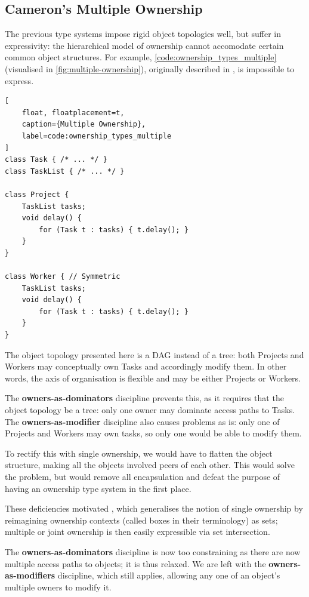 \documentclass{acm_proc_article-sp}
\begin{document}
\subsection{Cameron's Multiple Ownership}
\label{subsec:cameron}

The previous type systems impose rigid object topologies well, but suffer in
expressivity: the hierarchical model of ownership cannot accomodate certain
common object structures. For example,
\cref{code:ownership_types_multiple} (visualised in
\cref{fig:multiple-ownership}), originally described in
\cite{cameron07mojo}, is impossible to express.

\begin{lstlisting}[
	float, floatplacement=t,
	caption={Multiple Ownership},
	label=code:ownership_types_multiple
]
class Task { /* ... */ }
class TaskList { /* ... */ }

class Project {
	TaskList tasks;
	void delay() {
		for (Task t : tasks) { t.delay(); }
	}
}

class Worker { // Symmetric
	TaskList tasks;
	void delay() {
		for (Task t : tasks) { t.delay(); }
	}
}
\end{lstlisting}

The object topology presented here is a DAG instead of a tree: both Projects and
Workers may conceptually own Tasks and accordingly modify them. In other words,
the axis of organisation is flexible and may be either Projects or Workers.

The \textbf{owners-as-dominators} discipline prevents this, as it requires that
the object topology be a tree: only one owner may dominate access paths to
Tasks. The \textbf{owners-as-modifier} discipline also causes problems as is:
only one of Projects and Workers may own tasks, so only one would be able to
modify them.

To rectify this with single ownership, we would have to flatten the object
structure, making all the objects involved peers of each other. This would solve
the problem, but would remove all encapsulation and defeat the purpose of having
an ownership type system in the first place.

These deficiencies motivated \cite{cameron07mojo}, which generalises the notion
of single ownership by reimagining ownership contexts (called boxes in their
terminology) as sets; multiple or joint ownership is then easily expressible via
set intersection.

The \textbf{owners-as-dominators} discipline is now too constraining as there
are now multiple access paths to objects; it is thus relaxed. We are left with
the \textbf{owners-as-modifiers} discipline, which still applies, allowing any
one of an object's multiple owners to modify it.
\end{document}
